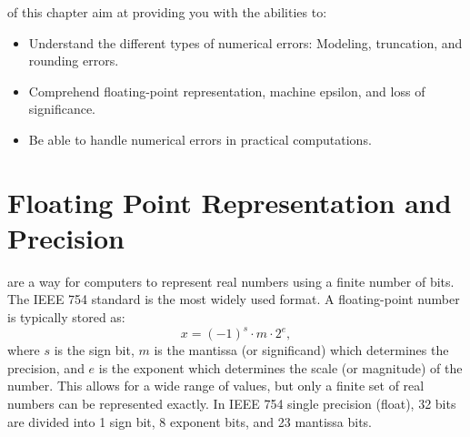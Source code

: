  of this chapter aim at providing you with the abilities to:
\begin{itemize}
    \item Understand the different types of numerical errors: Modeling, truncation, and rounding errors.
    \item Comprehend floating-point representation, machine epsilon, and loss of significance.
    \item Be able to handle numerical errors in practical computations.
\end{itemize}































\newpage
\section{Floating Point Representation and Precision}


 are a way for computers to represent real numbers using a finite number of bits. The IEEE 754\cite{ieeefloatingpoint} standard is the most widely used format. A floating-point number is typically stored as:
\begin{equation}
    x = (-1)^s \cdot m \cdot 2^e,
\end{equation}
where $s$ is the sign bit, $m$ is the mantissa (or significand) which determines the precision, and $e$ is the exponent which determines the scale (or magnitude) of the number. 
This allows for a wide range of values, but only a finite set of real numbers can be represented exactly.
In IEEE 754 single precision (float), 32 bits are divided into 1 sign bit, 8 exponent bits, and 23 mantissa bits.

